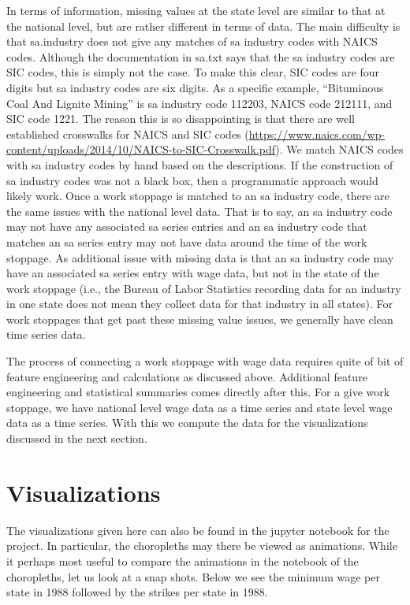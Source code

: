 \documentclass[reqno,11pt]{amsart}
\begin{document}
In terms of information, missing values at the state level are similar
to that at the national level, but are rather different in terms of data.
The main difficulty is that sa.industry does not give any matches of
sa industry codes with NAICS codes. Although the documentation in
sa.txt says that the sa industry codes are SIC codes, this is simply
not the case. To make this clear, SIC codes are four digits but
sa industry codes are six digits. As a specific example,
``Bituminous Coal And Lignite Mining'' is sa industry code 112203,	
NAICS code 212111, and SIC code 1221.
The reason this is so disappointing is that there are well established
crosswalks for NAICS and SIC codes
(\url{https://www.naics.com/wp-content/uploads/2014/10/NAICS-to-SIC-Crosswalk.pdf}).
We match NAICS codes with sa industry codes by hand based on the descriptions.
If the construction of sa industry codes was not a black box,
then a programmatic approach would likely work.
Once a work stoppage is matched to an sa industry code, there
are the same issues with the national level data. That is to say, 
an sa industry code may not have any associated sa series entries and
an sa industry code that matches an sa series entry may not have data
around the time of the work stoppage. As additional issue with missing data
is that an sa industry code may have an associated sa series entry
with wage data, but not in the state of the work stoppage (i.e., the 
Bureau of Labor Statistics recording data for an industry in one state
does not mean they collect data for that industry in all states).
For work stoppages that get past these missing value issues, we generally have
clean time series data.

The process of connecting a work stoppage with wage data requires quite of bit of feature engineering
and calculations as discussed above. Additional
feature engineering and statistical summaries comes directly after this.
For a give work stoppage, we have national level wage data as a time series and
state level wage data as a time series. With this we compute the data for the
visualizations discussed in the next section. 


\section{Visualizations}

The visualizations given here can also be found in the jupyter notebook for the project.
In particular, the choropleths may there be viewed as animations.
While it perhaps most useful to compare the animations in the notebook 
of the choropleths,
let us look at a snap shots. Below we see the minimum wage per state in 1988
followed by the strikes per state in 1988.
\end{document}
